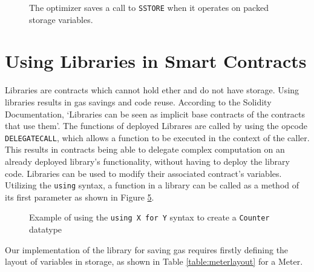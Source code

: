 \begin{figure}[htb]
  \begin{subfigure}[b]{\textwidth}
    \centering
    
    \label{fig:optimizer:a}
  \end{subfigure}

  \begin{subfigure}[b]{\textwidth}
    \centering
    
    \label{fig:optimizer:b}
  \end{subfigure}

  \begin{subfigure}[b]{\textwidth}
    \centering
    
    \label{fig:optimizer:c}
  \end{subfigure}

  \caption{The optimizer saves a call to \texttt{SSTORE} when it operates on packed storage variables.} 
  \label{fig:optimizer}
\end{figure}

\section{Using Libraries in Smart Contracts}

Libraries are contracts which cannot hold ether and do not have storage. Using libraries results in gas savings and code reuse. According to the Solidity Documentation, `Libraries can be seen as implicit base contracts of the contracts that use them'. The functions of deployed Librares are called by using the opcode \texttt{DELEGATECALL}, which allows a function to be executed in the context of the caller. This results in contracts being able to delegate complex computation on an already deployed library's functionality, without having to deploy the library code. Libraries can be used to modify their associated contract's variables. Utilizing the \texttt{using} syntax, a function in a library can be called as a method of its first parameter as shown in Figure \ref{fig:usingfor}.

\begin{figure}[htb]
    \centering
    
    \caption{Example of using the \texttt{using X for Y} syntax to create a \texttt{Counter} datatype~\cite{library}}
    \label{fig:usingfor}
\end{figure}

Our implementation of the library for saving gas requires firstly defining the layout of variables in storage, as shown in Table \ref{table:meterlayout} for a Meter. 


